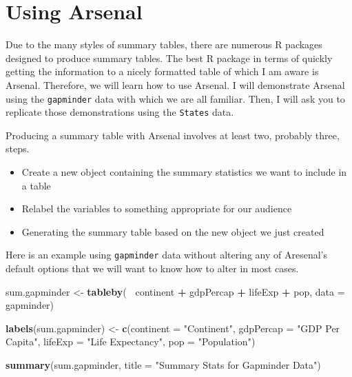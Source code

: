\documentclass[
]{book}
\newenvironment{Shaded}{\begin{snugshade}}{\end{snugshade}}
\newcommand{\DataTypeTok}[1]{\textcolor[rgb]{0.13,0.29,0.53}{#1}}
\newcommand{\KeywordTok}[1]{\textcolor[rgb]{0.13,0.29,0.53}{\textbf{#1}}}
\newcommand{\NormalTok}[1]{#1}
\newcommand{\OperatorTok}[1]{\textcolor[rgb]{0.81,0.36,0.00}{\textbf{#1}}}
\newcommand{\StringTok}[1]{\textcolor[rgb]{0.31,0.60,0.02}{#1}}
\providecommand{\tightlist}{%
  \setlength{\itemsep}{0pt}\setlength{\parskip}{0pt}}
\begin{document}
\hypertarget{using-arsenal}{%
\section{Using Arsenal}\label{using-arsenal}}

Due to the many styles of summary tables, there are numerous R packages designed to produce summary tables. The best R package in terms of quickly getting the information to a nicely formatted table of which I am aware is Arsenal. Therefore, we will learn how to use Arsenal. I will demonstrate Arsenal using the \texttt{gapminder} data with which we are all familiar. Then, I will ask you to replicate those demonstrations using the \texttt{States} data.

Producing a summary table with Arsenal involves at least two, probably three, steps.

\begin{itemize}
\tightlist
\item
  Create a new object containing the summary statistics we want to include in a table
\item
  Relabel the variables to something appropriate for our audience
\item
  Generating the summary table based on the new object we just created
\end{itemize}

Here is an example using \texttt{gapminder} data without altering any of Aresenal's default options that we will want to know how to alter in most cases.

\begin{Shaded}
\begin{Highlighting}[]
\NormalTok{sum.gapminder <-}\StringTok{ }\KeywordTok{tableby}\NormalTok{(}\OperatorTok{~}\StringTok{ }\NormalTok{continent }\OperatorTok{+}\StringTok{ }\NormalTok{gdpPercap }\OperatorTok{+}\StringTok{ }\NormalTok{lifeExp }\OperatorTok{+}\StringTok{ }\NormalTok{pop, }\DataTypeTok{data =}\NormalTok{ gapminder)}

\KeywordTok{labels}\NormalTok{(sum.gapminder) <-}\StringTok{ }\KeywordTok{c}\NormalTok{(}\DataTypeTok{continent =} \StringTok{"Continent"}\NormalTok{, }\DataTypeTok{gdpPercap =} \StringTok{"GDP Per Capita"}\NormalTok{, }\DataTypeTok{lifeExp =} \StringTok{"Life Expectancy"}\NormalTok{, }\DataTypeTok{pop =} \StringTok{"Population"}\NormalTok{)}
\end{Highlighting}
\end{Shaded}

\begin{Shaded}
\begin{Highlighting}[]
\KeywordTok{summary}\NormalTok{(sum.gapminder, }\DataTypeTok{title =} \StringTok{"Summary Stats for Gapminder Data"}\NormalTok{)}
\end{Highlighting}
\end{Shaded}
\end{document}
